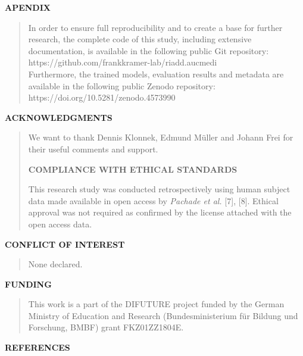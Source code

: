 \documentclass[
]{article}
\begin{document}
\textbf{APENDIX}

\begin{quote}
In order to ensure full reproducibility and to create a base for further
research, the complete code of this study, including extensive
documentation, is available in the following public Git repository:\\
https://github.com/frankkramer-lab/riadd.aucmedi\\
Furthermore, the trained models, evaluation results and metadata are
available in the following public Zenodo repository:\\
https://doi.org/10.5281/zenodo.4573990
\end{quote}

\textbf{ACKNOWLEDGMENTS}

\begin{quote}
We want to thank Dennis Klonnek, Edmund Müller and Johann Frei for their
useful comments and support.

\textbf{COMPLIANCE WITH ETHICAL STANDARDS}

This research study was conducted retrospectively using human subject
data made available in open access by \emph{Pachade et al.} {[}7{]},
{[}8{]}. Ethical approval was not required as confirmed by the license
attached with the open access data.
\end{quote}

\textbf{CONFLICT OF INTEREST}

\begin{quote}
None declared.
\end{quote}

\textbf{FUNDING}

\begin{quote}
This work is a part of the DIFUTURE project funded by the German
Ministry of Education and Research (Bundesministerium für Bildung und
Forschung, BMBF) grant FKZ01ZZ1804E.
\end{quote}

\textbf{REFERENCES}
\end{document}
